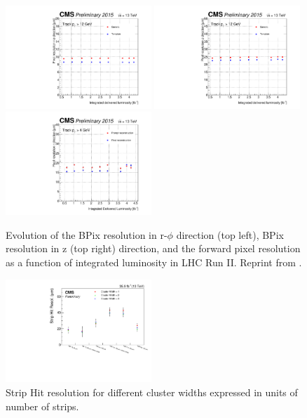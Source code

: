 \documentclass[thesis.tex]{subfiles}
\begin{document}
\begin{figure}[h]
	\centering
	\includegraphics[width=0.49\textwidth]{Fig/LumiPlot_x_GenericVsTemplate_ReReco_3.pdf}
	\includegraphics[width=0.49\textwidth]{Fig/LumiPlot_y_GenericVsTemplate_ReReco_3.pdf} \\
	\includegraphics[width=0.49\textwidth]{Fig/LuminosityHistoryPlot_all_template.pdf}
	\caption{Evolution of the BPix resolution in r-$\phi$ direction (top left), BPix resolution in z (top right) direction, and the forward pixel resolution as a function of integrated luminosity in LHC Run II. Reprint from \cite{PixelPerformance}.}
	\label{fig:pixelreso}
\end{figure}

\begin{figure}[h]
	\centering
	\includegraphics[width=0.49\textwidth]{Fig/StripHitRes.pdf}
	\caption{Strip Hit resolution for different cluster widths expressed in units of number of strips. }
	\label{fig:stripreso}
\end{figure}
\end{document}
